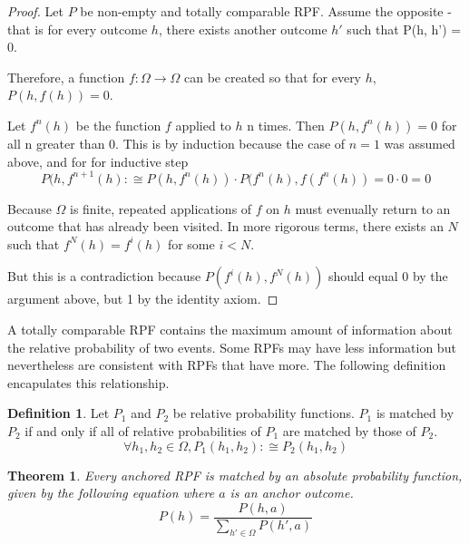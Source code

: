 \documentclass[twoside]{article}
\theoremstyle{plain}%
\newtheorem{theorem}{Theorem}[section]
\theoremstyle{definition}
\newtheorem{definition}{Definition}[section]
\theoremstyle{remark}
\begin{document}
\begin{proof}
Let \(P\) be non-empty and totally comparable RPF. Assume the opposite - that is for every outcome \(h\), there exists another outcome \(h'\) such that P(h, h') = 0.

Therefore, a function \(f: \Omega \rightarrow \Omega\) can be created so that for every \(h\), \(P(h, f(h)) = 0\).

Let \(f^n(h)\) be the function \(f\) applied to \(h\) n times. Then \(P(h, f^n(h)) = 0\) for all n greater than 0. This is by induction because the case of \(n = 1\) was assumed above, and for for inductive step\[P(h, f^{n+1}(h) :\cong P(h, f^n(h)) \cdot P(f^n(h), f(f^n(h)) = 0 \cdot 0 = 0\]

Because \(\Omega\) is finite, repeated applications of \(f\) on \(h\) must evenually return to an outcome that has already been visited. In more rigorous terms, there exists an \(N\) such that \(f^N(h) = f^i(h)\) for some \(i < N\).

But this is a contradiction because \(P(f^i(h), f^N(h))\) should equal 0 by the argument above, but 1 by the identity axiom.
\end{proof}

A totally comparable RPF contains the maximum amount of information about the relative probability of two events. Some RPFs may have less information but nevertheless are consistent with RPFs that have more. The following definition encapulates this relationship.

\begin{definition}
Let \(P_1\) and \(P_2\) be relative probability functions. \(P_1\) is matched by \(P_2\) if and only if all of relative probabilities of \(P_1\) are matched by those of \(P_2\).
\[\forall h_1, h_2 \in \Omega, P_1(h_1, h_2) :\cong P_2(h_1, h_2)\]
\end{definition}

\begin{theorem}
\label{thm:absolute_prob_formula}
Every anchored RPF is matched by an absolute probability function, given by the following equation where \(a\) is an anchor outcome.
\[P(h) = \frac{P(h, a)}{\sum_{h' \in \Omega}P(h', a)}\]
\end{theorem}
\end{document}

